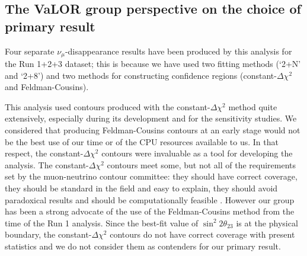 \clearpage


\subsection {The VaLOR group perspective on the choice of primary result}
\label{sec:primary_result_selection}

Four separate $\nu_{\mu}$-disappearance results have been produced by this analysis
for the Run 1+2+3 dataset; this is because we have used two fitting methods 
(`2+N' and `2+8') and two methods for constructing confidence regions (constant-$\Delta\chi^{2}$ 
and Feldman-Cousins).

This analysis used contours produced with the constant-$\Delta\chi^{2}$ method quite extensively, 
especially during its development and for the sensitivity studies. We considered that producing Feldman-Cousins 
contours at an early stage would not be the best use of our time or of the CPU resources available to us. 
In that respect, the constant-$\Delta\chi^{2}$ contours were invaluable as a tool for 
developing the analysis.
The constant-$\Delta\chi^{2}$ contours meet some, but not all of the requirements set by the
muon-neutrino contour committee: they should have correct coverage,
they should be standard in the field and easy to explain,
they should avoid paradoxical results and should be computationally feasible \cite{T2KNuMuContourCom}. However
our group has been a strong advocate of the use of the Feldman-Cousins method from the
time of the Run 1 analysis. Since the best-fit value of $\sin^{2}{2\theta_{23}}$ is at the physical boundary, 
the constant-$\Delta\chi^{2}$ contours do not have correct coverage with present statistics
and we do not consider them as contenders for our primary result.

